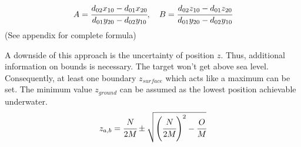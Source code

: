 \begin{equation}
	{A}=\cfrac{d_{02}x_{10}-d_{01}x_{20}}{d_{01}y_{20}-d_{02}y_{10}},~~~
	{B}=\cfrac{d_{02}z_{10}-d_{01}z_{20}}{d_{01}y_{20}-d_{02}y_{10}}
\end{equation}	
(See appendix for complete formula)

%
%
%
%
%
%
%
A downside of this approach is the uncertainty of position $z$. Thus, additional information on bounds is necessary. The target won't get above sea level. Consequently, at least one boundary $z_{surface}$ which acts like a maximum can be set. The minimum value $z_{ground}$ can be assumed as the lowest position achievable underwater. 
\begin{equation}
	z_{a,b}=\cfrac{{N}}{2{M}}\pm\sqrt{\left(\cfrac{{N}}{2{M}}\right)^2-\cfrac{{O}}{{M}}}
\end{equation}	

